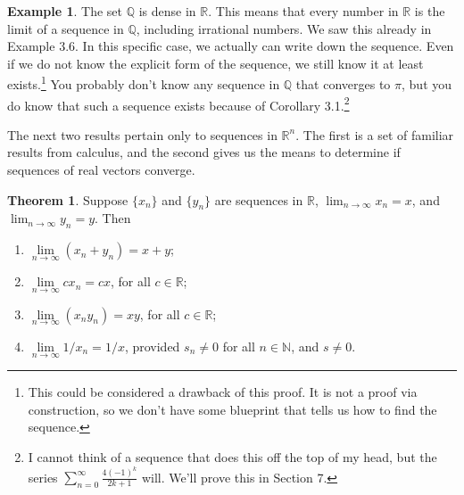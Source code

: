\documentclass{article}
\newcommand{\N}{\mathbb{N}}
\newcommand{\R}{\mathbb{R}}
\newcommand{\Q}{\mathbb{Q}}
\theoremstyle{definition}
\newtheorem{theorem}{Theorem}[section]
\newtheorem{example}{Example}[section]
\begin{document}
	\begin{example}
		The set $ \Q $ is dense in $ \R $. This means that every number in $ \R $ is the limit of a sequence in $ \Q $, including irrational numbers. We saw this already in Example 3.6. In this specific case, we actually can write down the sequence. Even if we do not know the explicit form of the sequence, we still know it at least exists.\footnote{This could be considered a drawback of this proof. It is not a proof via construction, so we don't have some blueprint that tells us how to find the sequence.} You probably don't know any sequence in $ \Q $ that converges to $ \pi $, but you do know that such a sequence exists because of Corollary 3.1.\footnote{I cannot think of a sequence that does this off the top of my head, but the series $ \sum_{n=0}^{\infty}\frac{4(-1)^k}{2k+1} $ will. We'll prove this in Section 7.} 
	\end{example}
	The next two results pertain only to sequences in $ \R^n $. The first is a set of familiar results from calculus, and the second gives us the means to determine if sequences of real vectors converge. 
	\begin{theorem}
		Suppose $ \{x_n\} $ and $ \{y_n\} $ are sequences in $ \R $, $ \lim_{n\to\infty}x_n=x $, and $ \lim_{n\to\infty}y_n=y $. Then
		\begin{enumerate}
			\item $ \lim\limits_{n\to\infty}(x_n+y_n)=x+y $;  
			\item $ \lim\limits_{n\to\infty}cx_n=cx $, for all $ c\in\R $; 
			\item $ \lim\limits_{n\to\infty}(x_ny_n)=xy $, for all $ c\in\R $;
			\item $ \lim\limits_{n\to\infty}1/x_n=1/x$, provided $ s_n\neq 0 $ for all $ n\in \N $, and $ s\neq 0 $.
		\end{enumerate}
	\end{theorem}
\end{document}
